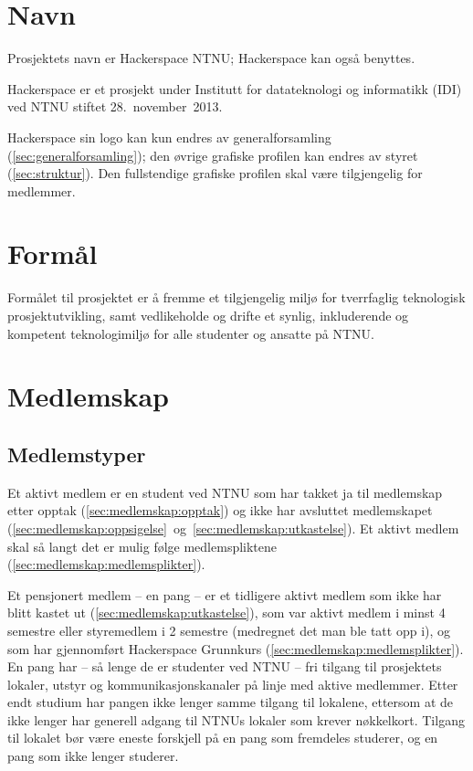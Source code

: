 \section{Navn}\label{sec:navn}
Prosjektets navn er Hackerspace NTNU; Hackerspace kan også benyttes.

Hackerspace er et prosjekt under Institutt for datateknologi og informatikk (IDI) ved NTNU stiftet 28.~november~2013.

Hackerspace sin logo kan kun endres av generalforsamling (\ref{sec:generalforsamling}); den øvrige grafiske profilen kan endres av styret (\ref{sec:struktur}). Den fullstendige grafiske profilen skal være tilgjengelig for medlemmer.


\section{Formål}\label{sec:formål}
Formålet til prosjektet er å fremme et tilgjengelig miljø for tverrfaglig teknologisk prosjektutvikling, samt vedlikeholde og drifte et synlig, inkluderende og kompetent teknologimiljø for alle studenter og ansatte på NTNU.\@


\section{Medlemskap}\label{sec:medlemskap}
\subsection{Medlemstyper}\label{sec:medlemskap:medlemstyper}
Et aktivt medlem er en student ved NTNU som har takket ja til medlemskap etter opptak (\ref{sec:medlemskap:opptak}) og ikke har avsluttet medlemskapet (\ref{sec:medlemskap:oppsigelse}~og~\ref{sec:medlemskap:utkastelse}).
Et aktivt medlem skal så langt det er mulig følge medlemspliktene (\ref{sec:medlemskap:medlemsplikter}).

Et pensjonert medlem -- en pang -- er et tidligere aktivt medlem som ikke har blitt kastet ut (\ref{sec:medlemskap:utkastelse}), som var aktivt medlem i minst 4 semestre eller styremedlem i 2 semestre (medregnet det man ble tatt opp i), og som har gjennomført Hackerspace Grunnkurs (\ref{sec:medlemskap:medlemsplikter}).
En pang har -- så lenge de er studenter ved NTNU -- fri tilgang til prosjektets lokaler, utstyr og kommunikasjonskanaler på linje med aktive medlemmer.
Etter endt studium har pangen ikke lenger samme tilgang til lokalene, ettersom at de ikke lenger har generell adgang til NTNUs lokaler som krever nøkkelkort. Tilgang til lokalet bør være eneste forskjell på en pang som fremdeles studerer, og en pang som ikke lenger studerer.

